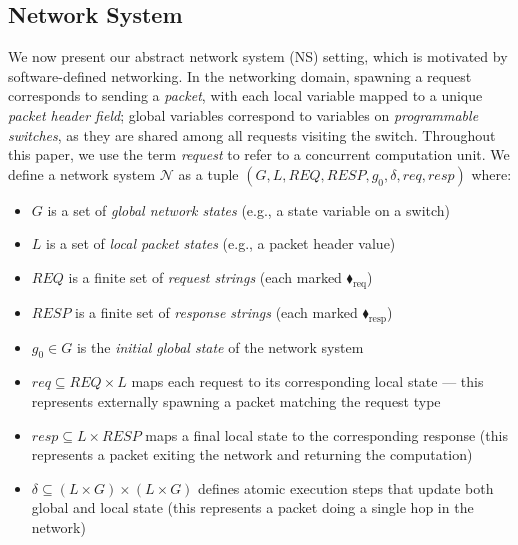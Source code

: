 \subsection{Network System}    
We now present our abstract network system (NS) setting, which is motivated by software-defined networking. In the networking domain, spawning a request corresponds to sending a \textit{packet}, with each local variable mapped to a unique \textit{packet header field}; global variables correspond to variables on \textit{programmable switches}, as they are shared among all requests visiting the switch. Throughout this paper, we use the term \emph{request} to refer to a concurrent computation unit. 
%
We define a network system $\mathcal{N}$ as a tuple $(G, L, \mathit{REQ},  \mathit{RESP}, g_0, \delta, \mathit{req}, \mathit{resp})$ where:
\begin{itemize}
\item $G$ is a set of \textit{global network states} (e.g., a state variable on a switch)

\item $L$ is a set of \textit{local packet states} (e.g., a packet header value)

\item $\mathit{REQ}$ is a finite set of\textit{ request strings} (each marked {\color{ForestGreen}$\blacklozenge_\text{req}$})

\item $\mathit{RESP}$ is a finite set of \textit{response strings} (each marked {\color{red}$\blacklozenge_\text{resp}$})

\item $g_0 \in G$ is the \textit{initial global state} of the network system

\item $\mathit{req} \subseteq \mathit{REQ} \times  L$ maps each request to its corresponding local state --- this represents externally spawning a packet matching the request type

\item $\mathit{resp} \subseteq L \times \mathit{RESP}$ maps a final local state to the corresponding response (this represents a packet exiting the network and returning the computation)

\item $\delta \subseteq  (L \times G) \times ( L \times G)$ defines atomic execution steps that update both global and local state (this represents a packet doing a single hop in the network)
\end{itemize}

